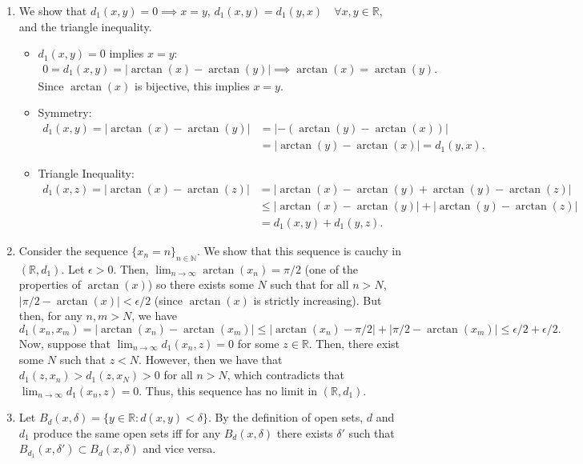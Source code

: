 \documentclass[11pt]{article}
\newcommand{\R}{\mathbb{R}}
\newcommand{\N}{\mathbb{N}}
\begin{document}
\begin{enumerate}[label=\arabic*., leftmargin=*, itemsep=10pt]
\begin{enumerate}
    \item We show that $d_1(x, y) = 0 \implies x = y$, $d_1(x, y) = d_1(y, x) \quad \forall x, y \in \R$, and the triangle inequality.
        \begin{itemize}
            \item $d_1(x, y) = 0$ implies $x = y$:
                \begin{align*}
                    0 = d_1(x, y) = |\arctan(x) - \arctan(y)| \implies \arctan(x) = \arctan(y)
                .\end{align*}
                Since $\arctan(x)$ is bijective, this implies $x = y$.
            \item Symmetry:
                \begin{align*}
                    d_1(x, y) = |\arctan(x) - \arctan(y)| &= |-(\arctan(y) - \arctan(x))|\\
                                                          &= |\arctan(y) - \arctan(x)| = d_1(y, x)
                .\end{align*}
            \item Triangle Inequality:
                \begin{align*}
                    d_1(x, z) = |\arctan(x) - \arctan(z)| &= |\arctan(x) - \arctan(y) + \arctan(y) - \arctan(z)| \\
                    &\leq |\arctan(x) - \arctan(y)| + |\arctan(y) - \arctan(z)|\\
                    &= d_1(x, y) + d_1(y, z)
                .\end{align*}
        \end{itemize}
    \item Consider the sequence $\{x_n = n\}_{n \in \N}$.
        We show that this sequence is cauchy in $(\R, d_1)$.
        Let $\epsilon > 0$.
        Then, $\lim_{n \to \infty} \arctan(x_n) = \pi / 2$ (one of the properties of $\arctan(x)$) so there exists some $N$ such that for all $n > N$, $|\pi / 2 - \arctan(x)| < \epsilon / 2$ (since $\arctan(x)$ is strictly increasing).
        But then, for any $n, m > N$, we have
        \[
        d_1(x_n, x_m) = |\arctan(x_n) - \arctan(x_m)| \leq |\arctan(x_n) - \pi / 2| + |\pi / 2 -  \arctan(x_m)| \leq \epsilon / 2 + \epsilon / 2
        .\] 
        Now, suppose that $\lim_{n \to \infty} d_1(x_n, z) = 0$ for some $z \in \R$.
        Then, there exist some $N$ such that $z < N$.
        However, then we have that $d_1(z, x_n) > d_1(z, x_N) > 0$ for all $n > N$, which contradicts that $\lim_{n \to \infty}d_1(x_n, z) = 0$.
        Thus, this sequence has no limit in $(\R, d_1)$.
    \item Let $B_{d}(x, \delta) = \{y \in \R : d(x, y) < \delta\}$.
        By the definition of open sets, $d$ and $d_1$ produce the same open sets iff for any $B_{d}(x, \delta)$ there exists $\delta'$ such that $B_{d_1}(x, \delta') \subset B_{d}(x, \delta)$ and vice versa.


\end{enumerate}
\end{enumerate}
\end{document}
